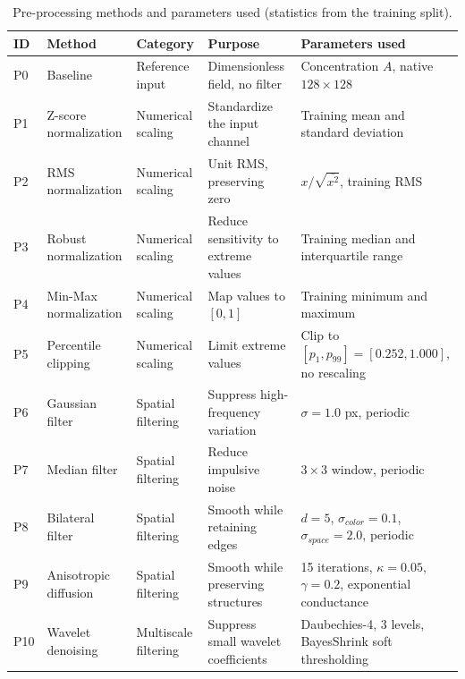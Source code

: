 \documentclass[final,5p,times,twocolumn]{elsarticle}
\begin{document}
\begin{table}[t]
    \centering
    \caption{Pre-processing methods and parameters used (statistics from the training split).}
    \label{tab:preprocessing}
    \small
    \begin{tabularx}{\textwidth}{L{0.65cm} L{3.0cm} L{2.35cm} Y Y}
        \toprule
        \textbf{ID} & \textbf{Method} & \textbf{Category} &
        \textbf{Purpose} & \textbf{Parameters used} \\
        \midrule
        P0 & Baseline & Reference input &
        Dimensionless field, no filter & Concentration $A$, native $128\times128$ \\
        P1 & Z-score normalization & Numerical scaling &
        Standardize the input channel & Training mean and standard deviation \\
        P2 & RMS normalization & Numerical scaling &
        Unit RMS, preserving zero & $x/\sqrt{\overline{x^2}}$, training RMS \\
        P3 & Robust normalization & Numerical scaling &
        Reduce sensitivity to extreme values & Training median and interquartile range \\
        P4 & Min-Max normalization & Numerical scaling &
        Map values to $[0,1]$ & Training minimum and maximum \\
        P5 & Percentile clipping & Numerical scaling &
        Limit extreme values & Clip to $[p_1,p_{99}]=[0.252,1.000]$, no rescaling \\
        P6 & Gaussian filter & Spatial filtering &
        Suppress high-frequency variation & $\sigma=1.0$ px, periodic \\
        P7 & Median filter & Spatial filtering &
        Reduce impulsive noise & $3\times3$ window, periodic \\
        P8 & Bilateral filter & Spatial filtering &
        Smooth while retaining edges & $d=5$, $\sigma_{color}=0.1$, $\sigma_{space}=2.0$, periodic \\
        P9 & Anisotropic diffusion & Spatial filtering &
        Smooth while preserving structures & 15 iterations, $\kappa=0.05$, $\gamma=0.2$, exponential conductance \\
        P10 & Wavelet denoising & Multiscale filtering &
        Suppress small wavelet coefficients & Daubechies-4, 3 levels, BayesShrink soft thresholding \\
        \bottomrule
    \end{tabularx}
\end{table}
\end{document}
